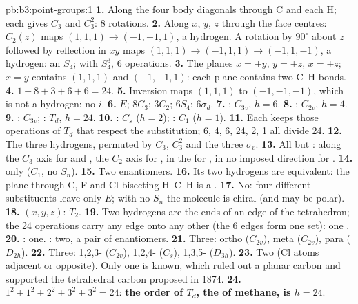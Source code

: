 \begin{solution}{pb:b3:point-groups:1}
\textbf{1.} Along the four body diagonals through C and each H; each gives
$C_3$ and $C_3^2$: 8 rotations.
\textbf{2.} Along $x$, $y$, $z$ through the face centres: $C_2(z)$ maps $(1,1,1)
\to (-1,-1,1)$, a hydrogen. A rotation by $90^\circ$ about $z$ followed by
reflection in $xy$ maps $(1,1,1) \to (-1,1,1) \to (-1,1,-1)$, a hydrogen: an
$S_4$; with $S_4^3$, 6 operations.
\textbf{3.} The planes $x = \pm y$, $y = \pm z$, $x = \pm z$; $x = y$ contains
$(1,1,1)$ and $(-1,-1,1)$: each plane contains two C--H bonds.
\textbf{4.} $1 + 8 + 3 + 6 + 6 = 24$.
\textbf{5.} Inversion maps $(1,1,1)$ to $(-1,-1,-1)$, which is not a hydrogen:
no $i$.
\textbf{6.} $E$; $8C_3$; $3C_2$; $6S_4$; $6\sigma_d$.
\textbf{7.} : $C_{3v}$, $h = 6$.
\textbf{8.} : $C_{2v}$, $h = 4$.
\textbf{9.} : $C_{3v}$; : $T_d$, $h = 24$.
\textbf{10.} : $C_s$ ($h = 2$); : $C_1$ ($h = 1$).
\textbf{11.} Each keeps those operations of $T_d$ that respect the
substitution; 6, 4, 6, 24, 2, 1 all divide 24.
\textbf{12.} The three hydrogens, permuted by $C_3$, $C_3^2$ and the three
$\sigma_v$.
\textbf{13.} All but : along the $C_3$ axis for  and ,
the $C_2$ axis for , in the  for , in no
imposed direction for .
\textbf{14.}  only ($C_1$, no $S_n$).
\textbf{15.} Two enantiomers.
\textbf{16.} Its two hydrogens are equivalent: the plane through C, F and Cl
bisecting H--C--H is a .
\textbf{17.} No: four different substituents leave only $E$; with no $S_n$ the
molecule is chiral (and may be polar).
\textbf{18.} $(x, y, z)$: $T_2$.
\textbf{19.} Two hydrogens are the ends of an edge of the tetrahedron; the 24
operations carry any edge onto any other (the 6 edges form one set): one
.
\textbf{20.} : one. : two, a pair of enantiomers.
\textbf{21.} Three: ortho ($C_{2v}$), meta ($C_{2v}$), para ($D_{2h}$).
\textbf{22.} Three: 1,2,3- ($C_{2v}$), 1,2,4- ($C_s$), 1,3,5- ($D_{3h}$).
\textbf{23.} Two (Cl atoms adjacent or opposite). Only one  is
known, which ruled out a planar carbon and supported the tetrahedral carbon
proposed in 1874.
\textbf{24.} $1^2 + 1^2 + 2^2 + 3^2 + 3^2 = 24$: \textbf{the order of $T_d$, the
 of methane, is $h = 24$}.
\end{solution}
